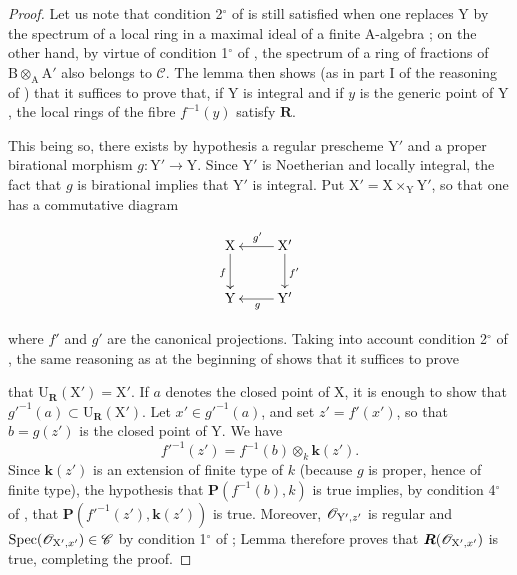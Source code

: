 \begin{proof}
Let us note that condition 2${}^\circ$ of  is still satisfied when one replaces $\mathrm{Y}$ by the spectrum of a local ring in a maximal ideal of a finite $\mathrm{A}$-algebra ; on the other hand, by virtue of condition 1${}^\circ$ of , the spectrum of a ring of fractions of $\mathrm{B}\otimes_\mathrm{A}\mathrm{A}'$ also belongs to $\mathcal{C}$. The lemma  then shows (as in part I of the reasoning of ) that it suffices to prove that, if $\mathrm{Y}$ is integral and if $y$ is the generic point of $\mathrm{Y}$, the local rings of the fibre $f^{-1}(y)$ satisfy $\boldsymbol{R}$.

This being so, there exists by hypothesis a regular prescheme $\mathrm{Y}'$ and a proper birational morphism $g:\mathrm{Y}'\to\mathrm{Y}$. Since $\mathrm{Y}'$ is Noetherian and locally integral, the fact that $g$ is birational implies that $\mathrm{Y}'$ is integral. Put $\mathrm{X}'=\mathrm{X}\times_\mathrm{Y}\mathrm{Y}'$, so that one has a commutative diagram

\begin{env}[7.9.8.1]
\label{IV.7.9.8.1}
\[
  \xymatrix{
    \mathrm{X} \ar[d]_f & \mathrm{X}' \ar[l]_{g'} \ar[d]^{f'} \\
    \mathrm{Y} & \mathrm{Y}' \ar[l]^g
  }
\]
\end{env}

where $f'$ and $g'$ are the canonical projections. Taking into account condition 2${}^\circ$ of , the same reasoning as at the beginning of  shows that it suffices to prove


that $\mathrm{U}_{\boldsymbol{R}}(\mathrm{X}')=\mathrm{X}'$. If $a$ denotes the closed point of $\mathrm{X}$, it is enough to show that $g'^{-1}(a)\subset\mathrm{U}_{\boldsymbol{R}}(\mathrm{X}')$. Let $x'\in g'^{-1}(a)$, and set $z'=f'(x')$, so that $b=g(z')$ is the closed point of $\mathrm{Y}$. We have
\[
  f'^{-1}(z')=f^{-1}(b)\otimes_k\boldsymbol{k}(z').
\]
Since $\boldsymbol{k}(z')$ is an extension of finite type of $k$ (because $g$ is proper, hence of finite type), the hypothesis that $\boldsymbol{P}(f^{-1}(b),k)$ is true implies, by condition 4${}^\circ$ of , that $\boldsymbol{P}(f'^{-1}(z'),\boldsymbol{k}(z'))$ is true. Moreover, $\mathscr{O}_{\mathrm{Y}',z'}$ is regular and $\operatorname{Spec}(\mathscr{O}_{\mathrm{X}',x'})\in\mathscr{C}$ by condition 1${}^\circ$ of ; Lemma  therefore proves that $\boldsymbol{R}(\mathscr{O}_{\mathrm{X}',x'})$ is true, completing the proof.
\end{proof}

